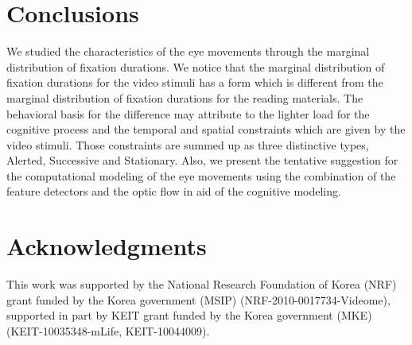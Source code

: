 \documentclass[10pt,letterpaper]{article}
\begin{document}
\section{Conclusions}

We studied the characteristics of the eye movements through the marginal distribution of fixation durations. We notice that the marginal distribution of fixation durations for the video stimuli has a form which is different from the marginal distribution of fixation durations for the reading materials. The behavioral basis for the difference may attribute to the lighter load for the cognitive process and the temporal and spatial constraints which are given by the video stimuli. Those constraints are summed up as three distinctive types, Alerted, Successive and Stationary. Also, we present the tentative suggestion for the computational modeling of the eye movements using the combination of the feature detectors and the optic flow in aid of the cognitive modeling.


\section{Acknowledgments}

This work was supported by the National Research Foundation of Korea (NRF) grant funded by the Korea government (MSIP) (NRF-2010-0017734-Videome), supported in part by KEIT grant funded by the Korea government (MKE) (KEIT-10035348-mLife, KEIT-10044009).



\setlength{\bibleftmargin}{.125in}
\setlength{\bibindent}{-\bibleftmargin}


\end{document}
